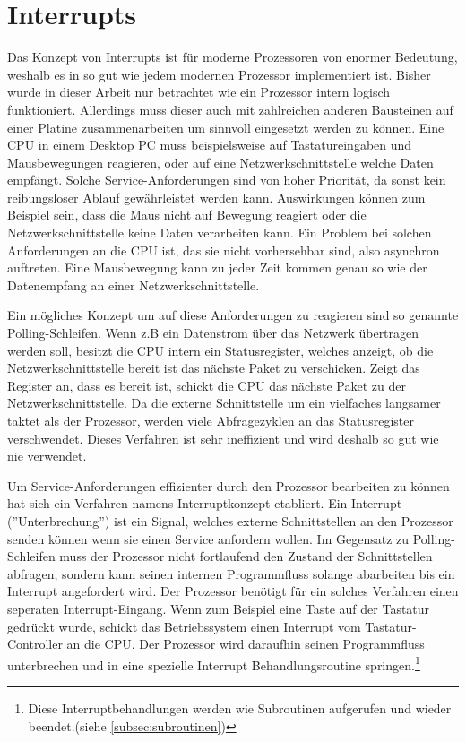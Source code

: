 \documentclass[a4paper,12pt]{article}
\begin{document}
\section{Interrupts}
Das Konzept von Interrupts ist für moderne Prozessoren von enormer Bedeutung, weshalb es in so gut wie jedem modernen Prozessor implementiert ist. Bisher wurde in dieser Arbeit nur betrachtet wie ein Prozessor intern logisch funktioniert. Allerdings muss dieser auch mit zahlreichen anderen Bausteinen auf einer Platine zusammenarbeiten um sinnvoll eingesetzt werden zu können. Eine CPU in einem Desktop PC muss beispielsweise auf Tastatureingaben und Mausbewegungen reagieren, oder auf eine Netzwerkschnittstelle welche Daten empfängt. Solche Service-Anforderungen sind von hoher Priorität, da sonst kein reibungsloser Ablauf gewährleistet werden kann. Auswirkungen können zum Beispiel sein, dass die Maus nicht auf Bewegung reagiert oder die Netzwerkschnittstelle keine Daten verarbeiten kann. Ein Problem bei solchen Anforderungen an die CPU ist, das sie nicht vorhersehbar sind, also asynchron auftreten. Eine Mausbewegung kann zu jeder Zeit kommen genau so wie der Datenempfang an einer Netzwerkschnittstelle. \cite[S.112ff]{mikroprozessortechnik2011}
\par\bigskip
\noindent Ein mögliches Konzept um auf diese Anforderungen zu reagieren sind so genannte Polling-Schleifen. Wenn z.B ein Datenstrom über das Netzwerk übertragen werden soll, besitzt die CPU intern ein Statusregister, welches anzeigt, ob die Netzwerkschnittstelle bereit ist das nächste Paket zu verschicken. Zeigt das Register an, dass es bereit ist, schickt die CPU das nächste Paket zu der Netzwerkschnittstelle. Da die externe Schnittstelle um ein vielfaches langsamer taktet als der Prozessor, werden viele Abfragezyklen an das Statusregister verschwendet. Dieses Verfahren ist sehr ineffizient und wird deshalb so gut wie nie verwendet. \cite{mikroprozessortechnik2011}
\par 
\noindent Um Service-Anforderungen effizienter durch den Prozessor bearbeiten zu können hat sich ein Verfahren namens Interruptkonzept etabliert. Ein Interrupt (''Unterbrechung'') ist ein Signal, welches externe Schnittstellen an den Prozessor senden können wenn sie einen Service anfordern wollen. Im Gegensatz zu Polling-Schleifen muss der Prozessor nicht fortlaufend den Zustand der Schnittstellen abfragen, sondern kann seinen internen Programmfluss solange abarbeiten bis ein Interrupt angefordert wird. Der Prozessor benötigt für ein solches Verfahren einen seperaten Interrupt-Eingang. Wenn zum Beispiel eine Taste auf der Tastatur gedrückt wurde, schickt das Betriebssystem einen Interrupt vom Tastatur-Controller an die CPU. Der Prozessor wird daraufhin seinen Programmfluss unterbrechen und in eine spezielle Interrupt Behandlungsroutine springen.\footnote{Diese Interruptbehandlungen werden wie Subroutinen aufgerufen und wieder beendet.(siehe \ref{subsec:subroutinen})}
\end{document}
